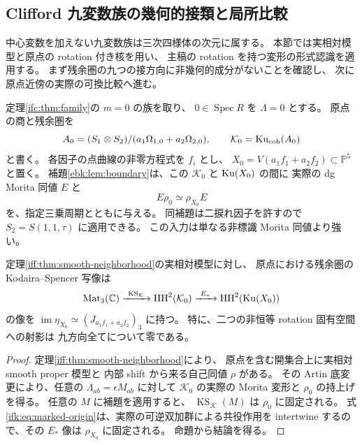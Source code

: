 \subsection{Clifford 九変数族の幾何的接類と局所比較}
\label{ifk:subsec:clifford-application}

中心変数を加えない九変数族は三次四様体の次元に属する。
本節では実相対模型と原点の rotation 付き核を用い、
主稿の rotation を持つ変形の形式認識を適用する。
まず残余圏の九つの接方向に非幾何的成分がないことを確認し、
次に原点近傍の実際の可換比較へ進む。

定理\ref{ifc:thm:family}の $m=0$ の族を取り、
$0\in\operatorname{Spec}R$ を $\Lambda=0$ とする。
原点の商と残余圏を
\[
 A_0=(S_1\otimes S_2)/(a_1\Omega_{1,0}+a_2\Omega_{2,0}),
 \qquad \mathcal K_0=\operatorname{Ku}_{\mathrm{coh}}(A_0)
\]
と書く。
各因子の点曲線の非零方程式を $f_i$ とし、
$X_0=V(a_1f_1+a_2f_2)\subset\mathbb P^5$ と置く。
補題\ref{ebk:lem:boundary}は、この $\mathcal K_0$ と $\operatorname{Ku}(X_0)$ の間に
実際の dg Morita 同値 $E$ と
\begin{equation}\label{ifk:eq:marked-origin}
 E\rho_0\simeq\rho_{X_0}E
\end{equation}
を、指定三乗周期とともに与える。
同補題は二捩れ因子を許すので $S_2=S(1,1,\tau)$ に適用できる。
この入力は単なる非標識 Morita 同値より強い。

\begin{proposition}[九方向の非幾何的成分の消滅]
\label{ifk:prop:clifford-geometric-ks}
定理\ref{iff:thm:smooth-neighborhood}の実相対模型に対し、
原点における残余圏の Kodaira--Spencer 写像は
\begin{equation}\label{ifk:eq:clifford-ks}
 \operatorname{Mat}_3(\mathbb C)
   \xrightarrow{\ \operatorname{KS}_{\mathcal K}\ }
 \mathrm{HH}^2(\mathcal K_0)
   \xrightarrow{\ E_*\ }
 \mathrm{HH}^2(\operatorname{Ku}(X_0))
\end{equation}
の像を $\operatorname{im}\eta_{X_0}\simeq(J_{a_1f_1+a_2f_2})_3$ に持つ。
特に、二つの非恒等 rotation 固有空間への射影は
九方向全てについて零である。
\end{proposition}

\begin{proof}
定理\ref{iff:thm:smooth-neighborhood}により、
原点を含む開集合上に実相対 smooth proper 模型と
内部 shift から来る自己同値 $\rho$ がある。
その Artin 底変更により、任意の
$\Lambda_{ab}=\epsilon M_{ab}$ に対して
$\mathcal K_0$ の実際の Morita 変形と $\rho_0$ の持上げを得る。
任意の $M$ に補題を適用すると、
$\operatorname{KS}_{\mathcal K}(M)$ は $\rho_0$ に固定される。
式\eqref{ifk:eq:marked-origin}は、実際の可逆双加群による共役作用を
intertwine するので、その $E_*$ 像は $\rho_{X_0}$ に固定される。
命題から結論を得る。
\end{proof}

